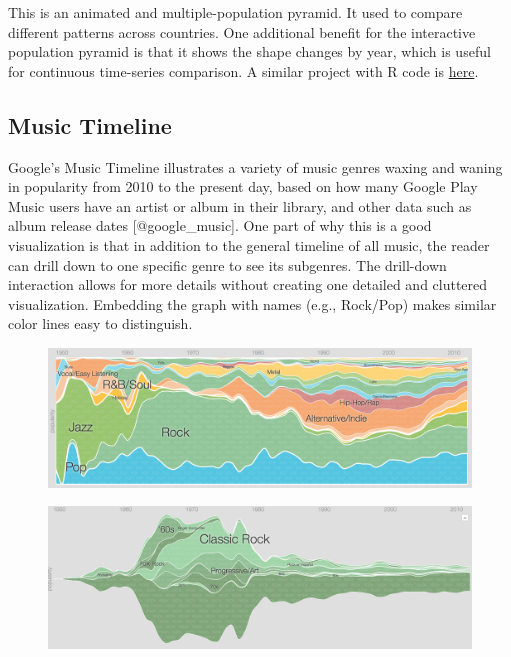 \documentclass[]{book}
\theoremstyle{definition}
\theoremstyle{definition}
\theoremstyle{definition}
\theoremstyle{remark}
\begin{document}
This is an animated and multiple-population pyramid. It used to compare
different patterns across countries. One additional benefit for the
interactive population pyramid is that it shows the shape changes by
year, which is useful for continuous time-series comparison. A similar
project with R code is
\href{https://www.r-bloggers.com/who-is-old-visualizing-the-concept-of-prospective-ageing-with-animated-population-pyramids/}{here}.

\subsection{Music Timeline}\label{music-timeline}

Google's Music Timeline illustrates a variety of music genres waxing and
waning in popularity from 2010 to the present day, based on how many
Google Play Music users have an artist or album in their library, and
other data such as album release dates {[}@google\_music{]}. One part of
why this is a good visualization is that in addition to the general
timeline of all music, the reader can drill down to one specific genre
to see its subgenres. The drill-down interaction allows for more details
without creating one detailed and cluttered visualization. Embedding the
graph with names (e.g., Rock/Pop) makes similar color lines easy to
distinguish.

\begin{figure}
\centering
\includegraphics{images/music_timeline.png}
\caption{}
\end{figure}

\begin{figure}
\centering
\includegraphics{images/music_timeline_rock.png}
\caption{}
\end{figure}
\end{document}
